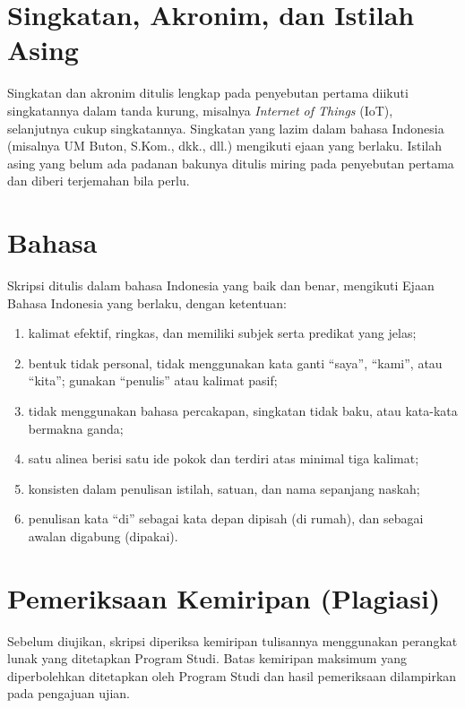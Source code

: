 \section{Singkatan, Akronim, dan Istilah Asing}
Singkatan dan akronim ditulis lengkap pada penyebutan pertama diikuti singkatannya dalam tanda kurung, misalnya \textit{Internet of Things} (IoT), selanjutnya cukup singkatannya. Singkatan yang lazim dalam bahasa Indonesia (misalnya UM Buton, S.Kom., dkk., dll.) mengikuti ejaan yang berlaku. Istilah asing yang belum ada padanan bakunya ditulis miring pada penyebutan pertama dan diberi terjemahan bila perlu.

\section{Bahasa}
Skripsi ditulis dalam bahasa Indonesia yang baik dan benar, mengikuti Ejaan Bahasa Indonesia yang berlaku, dengan ketentuan:
\begin{enumerate}
\item kalimat efektif, ringkas, dan memiliki subjek serta predikat yang jelas;
\item bentuk tidak personal, tidak menggunakan kata ganti “saya”, “kami”, atau “kita”; gunakan “penulis” atau kalimat pasif;
\item tidak menggunakan bahasa percakapan, singkatan tidak baku, atau kata-kata bermakna ganda;
\item satu alinea berisi satu ide pokok dan terdiri atas minimal tiga kalimat;
\item konsisten dalam penulisan istilah, satuan, dan nama sepanjang naskah;
\item penulisan kata “di” sebagai kata depan dipisah (di rumah), dan sebagai awalan digabung (dipakai).
\end{enumerate}

\section{Pemeriksaan Kemiripan (Plagiasi)}
Sebelum diujikan, skripsi diperiksa kemiripan tulisannya menggunakan perangkat lunak yang ditetapkan Program Studi. Batas kemiripan maksimum yang diperbolehkan ditetapkan oleh Program Studi dan hasil pemeriksaan dilampirkan pada pengajuan ujian.
